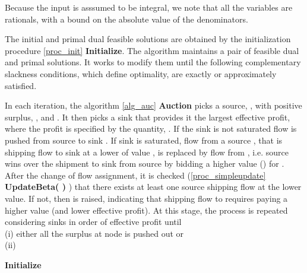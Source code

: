 \documentclass[11pt]{article}
\begin{document}
Because the input is asssumed to be integral, we note that all the variables
are rationals, with a bound on the absolute value of the denominators.

The initial and primal dual feasible solutions are obtained by the initialization 
procedure \ref{proc_init} {\bf Initialize}.
The algorithm maintains a pair of feasible dual and primal
solutions. It works to modify them until the following
complementary slackness conditions,
which define optimality, are exactly or approximately satisfied.

 

In each iteration, the algorithm \ref{alg_auc} {\bf Auction} picks a source,
, with  
positive surplus, , 
and . It then picks a sink  that provides it the 
largest effective profit, where the profit is specified by the quantity, 
. If the sink is not saturated
flow is pushed from source  to sink  .
If sink  is saturated, flow from a 
source  , that is shipping flow to sink  at a lower of value , is replaced
by flow from , i.e. source  wins over the shipment to sink  from source  by
bidding a higher value () for . 
After the change of flow assignment, it is checked  (\ref{proc_simpleupdate} {\bf UpdateBeta(  ) }) 
that there exists at least one source shipping flow at  the lower value. 
If not, then  is raised, indicating that
shipping flow to  requires paying a higher value (and lower effective profit).
At this stage, 
the process is repeated considering sinks in order of effective profit until \\
(i) either all the surplus
at node  is pushed out or \\
(ii)  


\begin{algorithm}
\begin{algorithmic}[1]
\vspace*{.1in}
\STATE{}
\STATE{}
\STATE{}
\STATE{}
\end{algorithmic}
\caption{{\bf Initialize}}
\label{proc_init}
\end{algorithm}
\end{document}
